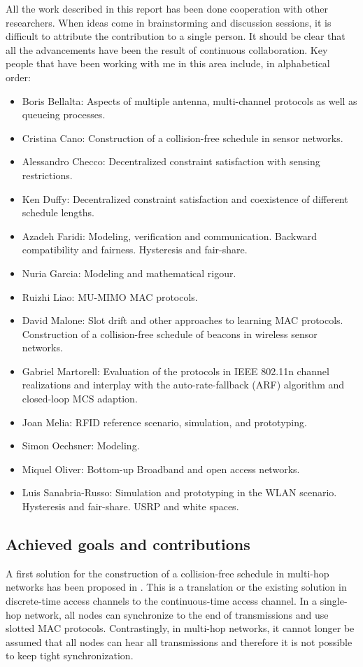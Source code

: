 \documentclass[a4paper,twocolumns]{article}%
\begin{document}
All the work described in this report has been done cooperation with other researchers.
When ideas come in brainstorming and discussion sessions, it is difficult to attribute the contribution to a single person.
It should be clear that all the advancements have been the result of continuous collaboration.
Key people that have been working with me in this area include, in alphabetical order:
\begin{itemize}
\item Boris Bellalta: Aspects of multiple antenna, multi-channel protocols as well as queueing processes.
\item Cristina Cano: Construction of a collision-free schedule in sensor networks.
\item Alessandro Checco: Decentralized constraint satisfaction with sensing restrictions.
\item Ken Duffy: Decentralized constraint satisfaction and coexistence of different schedule lengths.
\item Azadeh Faridi: Modeling, verification and communication. Backward compatibility and fairness. Hysteresis and fair-share.
\item Nuria Garcia: Modeling and mathematical rigour.
\item Ruizhi Liao: MU-MIMO MAC protocols.
\item David Malone: Slot drift and other approaches to learning MAC protocols. Construction of a collision-free schedule of beacons in wireless sensor networks.
\item Gabriel Martorell: Evaluation of the protocols in IEEE 802.11n channel realizations and interplay with the auto-rate-fallback (ARF) algorithm and closed-loop MCS adaption.
\item Joan Melia: RFID reference scenario, simulation, and prototyping.
\item Simon Oechsner: Modeling.
\item Miquel Oliver: Bottom-up Broadband and open access networks.
\item Luis Sanabria-Russo: Simulation and prototyping in the WLAN scenario. Hysteresis and fair-share. USRP and white spaces.
\end{itemize}

\subsection{Achieved goals and contributions}

A first solution for the construction of a collision-free schedule in multi-hop networks has been proposed in \cite{barcelo2013dcc}.
This is a translation or the existing solution in discrete-time access channels to the continuous-time access channel.
In a single-hop network, all nodes can synchronize to the end of transmissions and use slotted MAC protocols.
Contrastingly, in multi-hop networks, it cannot longer be assumed that all nodes can hear all transmissions and therefore it is not possible to keep tight synchronization.
\end{document}
